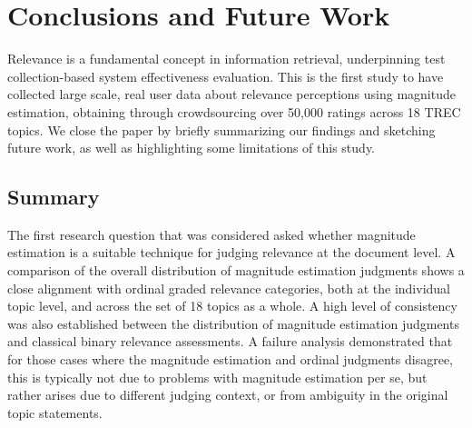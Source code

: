 
\section{Conclusions and Future Work}
\label{sec-conc}

% 
% 

Relevance is a fundamental concept in information retrieval,
underpinning test collection-based system effectiveness evaluation.
This is the first study to have collected large scale, real user data
about relevance perceptions using magnitude estimation, obtaining 
%
through crowdsourcing
%
over 50,000 ratings across 18 TREC topics. 
We close the paper by briefly summarizing our findings and sketching
future work, as well as highlighting some limitations of this study.

\subsection{Summary}
\label{sec:summary}


The first research question that was considered asked whether magnitude
estimation is a suitable technique for judging relevance at the
document level.
A comparison of the overall distribution of magnitude estimation
judgments shows a close alignment with ordinal graded relevance
categories, both at the individual topic level, and across the set of
18 topics as a whole.
A high level of consistency was also established between the
distribution of magnitude estimation judgments and classical binary
relevance assessments.
A failure analysis demonstrated that for those cases where the
magnitude estimation and ordinal judgments disagree, this is typically
not due to problems with magnitude estimation per se, but rather arises
due to different judging context, or from ambiguity in the original
topic statements.

